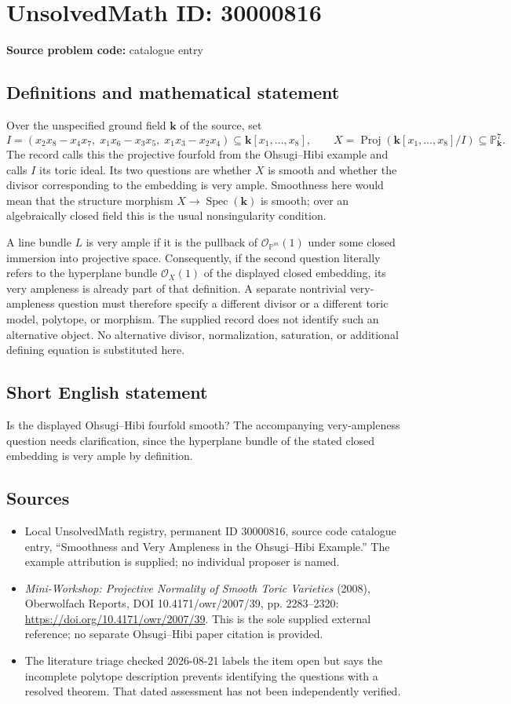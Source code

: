 \documentclass[11pt]{article}
\newcommand{\PP}{\mathbb{P}}
\begin{document}
\section*{UnsolvedMath ID: 30000816}
\textbf{Source problem code:} catalogue entry
\subsection{Definitions and mathematical statement}
Over the unspecified ground field \(\mathbf k\) of the source, set
\[
I=(x_2x_8-x_4x_7,\;x_1x_6-x_3x_5,\;x_1x_3-x_2x_4)
\subseteq\mathbf k[x_1,\ldots,x_8],
\qquad
X=\operatorname{Proj}(\mathbf k[x_1,\ldots,x_8]/I)\subseteq\PP^7_{\mathbf k}.
\]
The record calls this the projective fourfold from the Ohsugi--Hibi example and calls \(I\) its toric ideal. Its two questions are whether \(X\) is smooth and whether the divisor corresponding to the embedding is very ample. Smoothness here would mean that the structure morphism \(X\to\operatorname{Spec}(\mathbf k)\) is smooth; over an algebraically closed field this is the usual nonsingularity condition.

A line bundle \(L\) is very ample if it is the pullback of \(\mathcal O_{\PP^m}(1)\) under some closed immersion into projective space. Consequently, if the second question literally refers to the hyperplane bundle \(\mathcal O_X(1)\) of the displayed closed embedding, its very ampleness is already part of that definition. A separate nontrivial very-ampleness question must therefore specify a different divisor or a different toric model, polytope, or morphism. The supplied record does not identify such an alternative object. No alternative divisor, normalization, saturation, or additional defining equation is substituted here.
\subsection{Short English statement}
Is the displayed Ohsugi--Hibi fourfold smooth? The accompanying very-ampleness question needs clarification, since the hyperplane bundle of the stated closed embedding is very ample by definition.
\subsection{Sources}
\begin{itemize}
\item Local UnsolvedMath registry, permanent ID \(30000816\), source code catalogue entry, ``Smoothness and Very Ampleness in the Ohsugi--Hibi Example.'' The example attribution is supplied; no individual proposer is named.
\item \emph{Mini-Workshop: Projective Normality of Smooth Toric Varieties} (2008), Oberwolfach Reports, DOI 10.4171/owr/2007/39, pp. 2283--2320: \url{https://doi.org/10.4171/owr/2007/39}. This is the sole supplied external reference; no separate Ohsugi--Hibi paper citation is provided.
\item The literature triage checked 2026-08-21 labels the item open but says the incomplete polytope description prevents identifying the questions with a resolved theorem. That dated assessment has not been independently verified.
\end{itemize}
\end{document}
